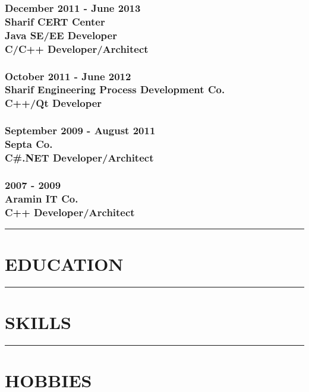 \documentclass[10pt,a4paper]{article}
\begin{document}
\subsubsection{\textnormal {December 2011 - June 2013} \\ \textnormal {Sharif CERT Center} \\ Java SE/EE Developer \\ C/C++ Developer/Architect}
  \setlength{\leftskip}{0.5cm}
  \setlength{\rightskip}{1cm}
  \lipsum[2]
  \setlength{\leftskip}{0pt}
  \setlength{\rightskip}{0cm}
	  
\subsubsection{\textnormal {October 2011 - June 2012} \\ \textnormal {Sharif Engineering Process Development Co.} \\ C++/Qt Developer}
  \setlength{\leftskip}{0.5cm}
  \setlength{\rightskip}{1cm}
  \lipsum[2]
  \setlength{\leftskip}{0pt}
  \setlength{\rightskip}{0cm}
  
\subsubsection{\textnormal {September 2009 - August 2011} \\ \textnormal {Septa Co.} \\ C\#.NET Developer/Architect}
  \setlength{\leftskip}{0.5cm}
  \setlength{\rightskip}{1cm}
  \lipsum[2]
  \setlength{\leftskip}{0pt}
  \setlength{\rightskip}{0cm}
  
\subsubsection{\textnormal {2007 - 2009} \\ \textnormal {Aramin IT Co.} \\ C++ Developer/Architect}
  \setlength{\leftskip}{0.5cm}
  \setlength{\rightskip}{1cm}
  \lipsum[2]
  \setlength{\leftskip}{0pt}
  \setlength{\rightskip}{0cm}

\rule {15cm}{0.4pt}

\section{EDUCATION}

\rule {15cm}{0.4pt}

\section{SKILLS}

\rule {15cm}{0.4pt}

\section{HOBBIES}
\end{document}
